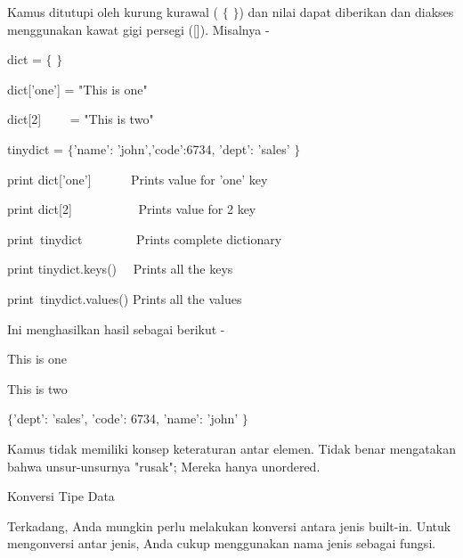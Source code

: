 \vspace{12pt}
\noindent 
Kamus ditutupi oleh kurung kurawal ( $  \{  $ $  \}  $) dan nilai dapat diberikan dan diakses menggunakan kawat gigi persegi ([]). $  $Misalnya - \par
\vspace{12pt}
\vspace{12pt}
\noindent 
dict =  $  \{  $ $  \}  $ \par
\noindent 
dict['one'] = "This is one" \par
\noindent 
dict[2]~~~~ = "This is two" \par
\vspace{12pt}
\noindent 
tinydict =  $  \{  $'name': 'john','code':6734, 'dept': 'sales' $  \}  $ \par
\vspace{12pt}
\vspace{12pt}
\noindent 
print dict['one']~~ ~~~  Prints value for 'one' key \par
\noindent 
print dict[2]~~~~~~~~~~  Prints value for 2 key \par
\noindent 
print~tinydict~~~~~~~~   Prints complete dictionary \par
\noindent 
print tinydict.keys()~~  Prints all the keys \par
\noindent 
print~tinydict.values()   Prints all the values \par
\noindent 
Ini menghasilkan hasil sebagai berikut - \par
\noindent 
This is one \par
\noindent 
This is two \par
\noindent 
 $  \{  $'dept': 'sales', 'code': 6734, 'name': 'john' $  \}  $ \par
{} \par
{} \par
\vspace{12pt}
\noindent 
Kamus tidak memiliki konsep keteraturan antar elemen. $  $Tidak benar mengatakan bahwa unsur-unsurnya "rusak"; $  $Mereka hanya unordered. \par
\vspace{12pt}
\noindent 
Konversi Tipe Data \par
\vspace{12pt}
\noindent 
Terkadang, Anda mungkin perlu melakukan konversi antara jenis built-in. $  $Untuk mengonversi antar jenis, Anda cukup menggunakan nama jenis sebagai fungsi. \par
\noindent 

